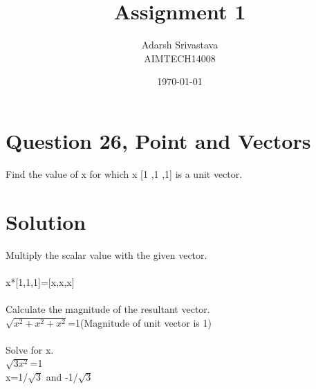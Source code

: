 \documentclass[a4paper,12pt]{article}
\begin{document}
\title{Assignment 1}
\author{Adarsh Srivastava\\AIMTECH14008}
\date{\today}
\maketitle
\section{Question 26, Point and Vectors}
Find the value of x for which x [1 ,1 ,1] is a unit vector.
\section{Solution}
\vspace{2mm}Multiply the scalar value with the given vector.\\ 
\\
x*[1,1,1]=[x,x,x]\\
\\
\vspace{2mm}Calculate the magnitude of the resultant vector.\\
\vspace{2mm}$\sqrt{x^2+x^2+x^2}$=1(Magnitude of unit vector is 1)\\
\\
\vspace{2mm}Solve for x.\\
\vspace{2mm}$\sqrt{3x^2}$=1\\
\vspace{2mm}x=1/$\sqrt{3}$ and -1/$\sqrt{3}$\\
\end{document}

